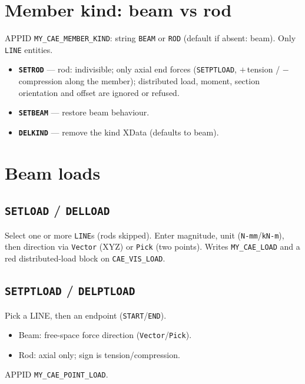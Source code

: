 \documentclass[a4paper]{ltxdoc}
\newcommand{\cadcmd}[1]{\texttt{\textbf{#1}}}
\newcommand{\appid}[1]{\texttt{#1}}
\begin{document}
\section{Member kind: beam vs rod}

APPID \appid{MY\_CAE\_MEMBER\_KIND}: string \texttt{BEAM} or \texttt{ROD}
(default if absent: beam).  Only \texttt{LINE} entities.

\begin{itemize}[nosep]
  \item \cadcmd{SETROD} --- rod: indivisible; only axial end forces
        (\texttt{SETPTLOAD}, $+\,$tension / $-\,$compression along the
        member); distributed load, moment, section orientation and offset
        are ignored or refused.
  \item \cadcmd{SETBEAM} --- restore beam behaviour.
  \item \cadcmd{DELKIND} --- remove the kind XData (defaults to beam).
\end{itemize}

\section{Beam loads}

\subsection{\cadcmd{SETLOAD} / \cadcmd{DELLOAD}}
Select one or more \texttt{LINE}s (rods skipped).  Enter magnitude, unit
(\texttt{N-mm}/\texttt{kN-m}), then direction via
\texttt{Vector} (XYZ) or \texttt{Pick} (two points).  Writes
\appid{MY\_CAE\_LOAD} and a red distributed-load block on
\texttt{CAE\_VIS\_LOAD}.

\subsection{\cadcmd{SETPTLOAD} / \cadcmd{DELPTLOAD}}
Pick a LINE, then an endpoint (\texttt{START}/\texttt{END}).
\begin{itemize}[nosep]
  \item Beam: free-space force direction (\texttt{Vector}/\texttt{Pick}).
  \item Rod: axial only; sign is tension/compression.
\end{itemize}
APPID \appid{MY\_CAE\_POINT\_LOAD}.
\end{document}
